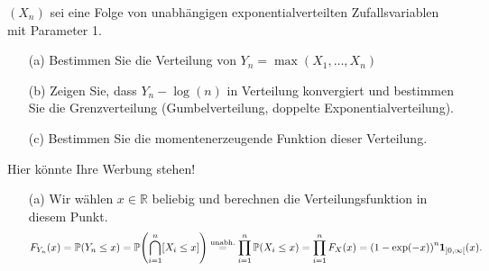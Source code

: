 \begin{exercise}
$(X_n)$ sei eine Folge von unabhängigen exponentialverteilten Zufallsvariablen
mit Parameter 1.
\begin{itemize}
  \item[(a)] Bestimmen Sie die Verteilung von $Y_n = \max(X_1,\dots,X_n)$
  \item[(b)] Zeigen Sie, dass $Y_n - \log(n)$ in Verteilung konvergiert und bestimmen
  Sie die Grenzverteilung (Gumbelverteilung, doppelte Exponentialverteilung).
  \item[(c)] Bestimmen Sie die momentenerzeugende Funktion dieser Verteilung.
\end{itemize}
\end{exercise}
\begin{solution}
  Hier könnte Ihre Werbung stehen!
  \begin{itemize}
    \item[(a)] Wir wählen $x \in \mathbb{R}$ beliebig und berechnen die Verteilungsfunktion in diesem Punkt.
      \begin{align*}
        F_{Y_n}(x) = \mathbb{P}{\left ( Y_n \leq x \right )} = \mathbb{P}{\left ( \bigcap_{i=1}^n [X_i \leq x] \right )} \stackrel{\text{unabh.}}{=} \prod_{i=1}^n \mathbb{P}{\left ( X_i \leq x \right )} = \prod_{i=1}^n F_X(x) = {\left ( 1 - \exp(-x) \right )}^n \mathbf{1}_{]0,\infty[}(x).
      \end{align*}


\end{itemize}
\end{solution}
